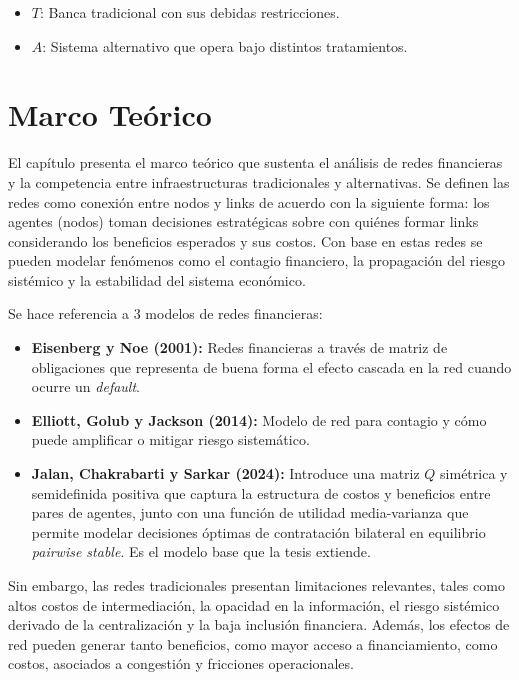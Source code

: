 \documentclass[12pt,a4paper]{article}
\begin{document}
\begin{itemize}
    \item $T$: Banca tradicional con sus debidas restricciones.
    \item $A$: Sistema alternativo que opera bajo distintos tratamientos.
\end{itemize}


\section*{Marco Teórico}

El capítulo presenta el marco teórico que sustenta el análisis de redes financieras y la
competencia entre infraestructuras tradicionales y alternativas. Se definen las redes como
conexión entre nodos y links de acuerdo con la siguiente forma: los agentes (nodos) toman
decisiones estratégicas sobre con quiénes formar links considerando los beneficios esperados
y sus costos. Con base en estas redes se pueden modelar fenómenos como el contagio
financiero, la propagación del riesgo sistémico y la estabilidad del sistema económico.

Se hace referencia a 3 modelos de redes financieras:

\begin{itemize}
    \item \textbf{Eisenberg y Noe (2001):} Redes financieras a través de matriz de obligaciones
    que representa de buena forma el efecto cascada en la red cuando ocurre un \textit{default}.

    \item \textbf{Elliott, Golub y Jackson (2014):} Modelo de red para contagio y cómo puede
    amplificar o mitigar riesgo sistemático.

    \item \textbf{Jalan, Chakrabarti y Sarkar (2024):} Introduce una matriz $Q$ simétrica y semidefinida
    positiva que captura la estructura de costos y beneficios entre pares de agentes, junto con
    una función de utilidad media-varianza que permite modelar decisiones óptimas de
    contratación bilateral en equilibrio \textit{pairwise stable}. Es el modelo base que la tesis
    extiende.
\end{itemize}

Sin embargo, las redes tradicionales presentan limitaciones relevantes, tales como altos costos
de intermediación, la opacidad en la información, el riesgo sistémico derivado de la
centralización y la baja inclusión financiera. Además, los efectos de red pueden generar tanto
beneficios, como mayor acceso a financiamiento, como costos, asociados a congestión y
fricciones operacionales.
\end{document}
